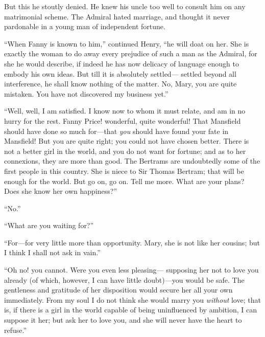 But this he stoutly denied.  He knew his uncle too well
to consult him on any matrimonial scheme.  The Admiral
hated marriage, and thought it never pardonable in a young
man of independent fortune.

``When Fanny is known to him,'' continued Henry, ``he will doat
on her.  She is exactly the woman to do away every prejudice
of such a man as the Admiral, for she he would describe,
if indeed he has now delicacy of language enough to embody
his own ideas.  But till it is absolutely settled---%
settled beyond all interference, he shall know nothing
of the matter.  No, Mary, you are quite mistaken.
You have not discovered my business yet.''

``Well, well, I am satisfied.  I know now to whom
it must relate, and am in no hurry for the rest.
Fanny Price! wonderful, quite wonderful!  That Mansfield
should have done so much for---that \emph{you} should have
found your fate in Mansfield!  But you are quite right;
you could not have chosen better.  There is not a better
girl in the world, and you do not want for fortune;
and as to her connexions, they are more than good.
The Bertrams are undoubtedly some of the first people
in this country.  She is niece to Sir Thomas Bertram;
that will be enough for the world.  But go on, go on.
Tell me more.  What are your plans?  Does she know her
own happiness?''

``No.''

``What are you waiting for?''

``For---for very little more than opportunity.  Mary, she is
not like her cousins; but I think I shall not ask in vain.''

``Oh no! you cannot.  Were you even less pleasing---%
supposing her not to love you already (of which,
however, I can have little doubt)---you would be safe.
The gentleness and gratitude of her disposition would
secure her all your own immediately.  From my soul I do
not think she would marry you \emph{without} love; that is,
if there is a girl in the world capable of being uninfluenced
by ambition, I can suppose it her; but ask her to love you,
and she will never have the heart to refuse.''


